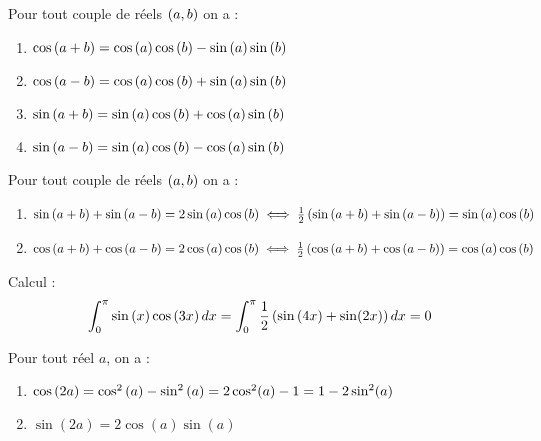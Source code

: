 \begin{formu} 
	Pour tout couple de réels \(\left(a,b\right)\) on a :
	\begin{enumerate}
		\item \( \cos\left(a+b\right) = \cos\left(a\right) \cos\left(b\right) - \sin\left(a\right) \sin\left(b\right) \) \\
		\item \( \cos\left(a-b\right) = \cos\left(a\right) \cos\left(b\right) + \sin\left(a\right) \sin\left(b\right) \)\\
		\item \( \sin\left(a+b\right) = \sin\left(a\right) \cos\left(b\right) + \cos\left(a\right) \sin\left(b\right) \) \\
		\item \( \sin\left(a-b\right) = \sin\left(a\right) \cos\left(b\right) - \cos\left(a\right) \sin\left(b\right) \)\\
	\end{enumerate}
\end{formu}

\begin{formu}
	Pour tout couple de réels \(\left(a,b\right)\) on a :
	\begin{enumerate}
		\item \( \sin\left(a+b\right) + \sin\left(a-b\right) = 2\sin\left(a\right) \cos\left(b\right) \iff \frac{1}{2}\left(\sin\left(a+b\right) + \sin\left(a-b\right)\right) = \sin\left(a\right) \cos\left(b\right)\) \\
		\item \( \cos\left(a+b\right) + \cos\left(a-b\right) = 2\cos\left(a\right) \cos\left(b\right) \iff \frac{1}{2}\left(\cos\left(a+b\right) + \cos\left(a-b\right)\right) = \cos\left(a\right) \cos\left(b\right)\)

	\end{enumerate}

\end{formu}

\begin{appl}
	Calcul : \[\int_{0}^{\pi} \sin\left(x\right) \cos\left(3x\right) dx = \int_{0}^{\pi} \frac{1}{2} \left(\sin\left(4x\right)+\sin(2x)\right)dx = 0\]
\end{appl}

\begin{formu}
	Pour tout réel \(a\), on a :
	\begin{enumerate}
		\item \(\cos\left(2a\right) = \cos^2\left(a\right) - \sin^2\left(a\right) = 2\cos^2(a)-1 = 1-2\sin^2(a) \)
		\item \(\sin(2a) = 2\cos(a)\sin(a) \)
	\end{enumerate}
\end{formu}

